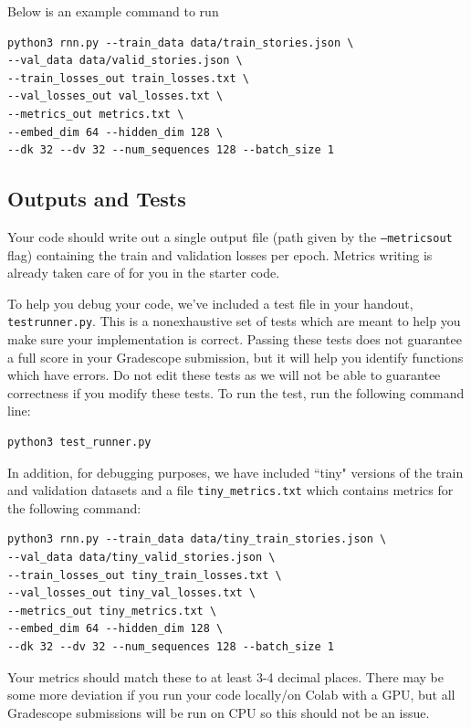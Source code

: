 \documentclass[11pt,addpoints,answers]{exam}
\begin{document}
Below is an example command to run

\begin{lstlisting}
python3 rnn.py --train_data data/train_stories.json \
--val_data data/valid_stories.json \
--train_losses_out train_losses.txt \ 
--val_losses_out val_losses.txt \
--metrics_out metrics.txt \
--embed_dim 64 --hidden_dim 128 \
--dk 32 --dv 32 --num_sequences 128 --batch_size 1 
\end{lstlisting}
\vspace{0.2 in}

\subsection{Outputs and Tests} 
Your code should write out a single output file (path given by the \texttt{--metrics\textunderscore out} flag) containing the train and validation losses per epoch. Metrics writing is already taken care of for you in the starter code.

To help you debug your code, we’ve included a test file in your handout, \texttt{test\textunderscore runner.py}. This is a nonexhaustive set of tests which are meant to help you make sure your implementation is correct. Passing these tests does not guarantee a full score in your Gradescope submission, but it will help you identify functions which have errors. Do not edit these tests as we will not be able to guarantee correctness if you modify these tests. To run the test, run the following command line:
\begin{lstlisting}[language=Shell]
python3 test_runner.py
\end{lstlisting}

In addition, for debugging purposes, we have included ``tiny" versions of the train and validation datasets and a file \texttt{tiny\_metrics.txt} which contains metrics for the following command:
\begin{lstlisting}
python3 rnn.py --train_data data/tiny_train_stories.json \
--val_data data/tiny_valid_stories.json \
--train_losses_out tiny_train_losses.txt \ 
--val_losses_out tiny_val_losses.txt \
--metrics_out tiny_metrics.txt \
--embed_dim 64 --hidden_dim 128 \
--dk 32 --dv 32 --num_sequences 128 --batch_size 1 
\end{lstlisting}

Your metrics should match these to at least 3-4 decimal places. There may be some more deviation if you run your code locally/on Colab with a GPU, but all Gradescope submissions will be run on CPU so this should not be an issue.
\end{document}
